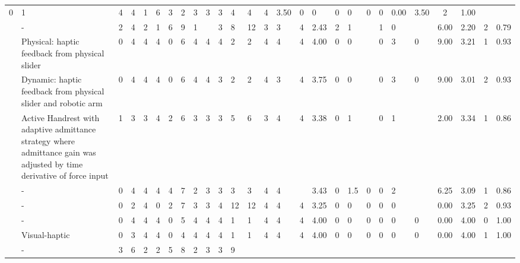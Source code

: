 \begin{table}[htbp]
\begin{tabular}{lp{4cm}lllllllllllllllllllllcccc}
  0 &
  1 &
  4 &
  4 &
  1 &
  6 &
  3 &
  2 &
  3 &
  3 &
  3 &
  4 &
  4 &
  4 &
  3.50 &
  0 &
  0 &
  0\footnotemark[20] &
  0 &
  0 &
  0 &
  0.00 &
  3.50 &
  2 &
  1.00 \\
\cite{Chappell2022} &
  - &
  2 &
  4 &
  2 &
  1 &
  6 &
  9 &
  1 &
   &
  3 &
  8 &
  12 &
  3 &
  3 &
  4 &
  2.43 &
  2 &
  1 &
   &
  1\footnotemark[21] &
  0 &
   &
  6.00 &
  2.20 &
  2 &
  0.79 \\
\cite{Dai2023} &
  Physical: haptic feedback from physical slider &
  0 &
  4 &
  4 &
  4 &
  0 &
  6 &
  4 &
  4 &
  4 &
  2 &
  2 &
  4 &
  4 &
  4\footnotemark[22] &
  4.00 &
  0 &
  0 &
   &
  0 &
  3 &
  0 &
  9.00 &
  3.21 &
  1 &
  0.93 \\
\cite{Dai2023} &
  Dynamic: haptic feedback from physical slider and robotic arm &
  0 &
  4 &
  4 &
  4 &
  0 &
  6 &
  4 &
  4 &
  3 &
  2 &
  2 &
  4 &
  3\footnotemark[23] &
  4\footnotemark[22] &
  3.75 &
  0 &
  0 &
   &
  0 &
  3 &
  0 &
  9.00 &
  3.01 &
  2 &
  0.93 \\
\cite{Fehlberg2012} &
  Active Handrest with adaptive admittance strategy where   admittance gain was adjusted by time derivative of force input &
  1 &
  3 &
  3 &
  4 &
  2 &
  6 &
  3 &
  3 &
  3 &
  5 &
  6 &
  3 &
  4 &
  4 &
  3.38 &
  0 &
  1 &
   &
  0 &
  1 &
   &
  2.00 &
  3.34 &
  1 &
  0.86 \\
\cite{Grant2019} &
  - &
  0 &
  4 &
  4 &
  4 &
  4 &
  7 &
  2 &
  3\footnotemark[24] &
  3 &
  3 &
  3 &
  4 &
  4\footnotemark[25] &
   &
  3.43 &
  0 &
  1.5\footnotemark[26] &
  0 &
  0 &
  2 &
   &
  6.25 &
  3.09 &
  1 &
  0.86 \\
\cite{Gunter2022} &
  - &
  0 &
  2 &
  4 &
  0 &
  2 &
  7 &
  3 &
  3 &
  4 &
  12 &
  12 &
  4 &
  4 &
  4\footnotemark[27] &
  3.25 &
  0 &
  0 &
  0 &
  0 &
  0 &
   &
  0.00 &
  3.25 &
  2 &
  0.93 \\
\cite{Huang2006} &
  - &
  0 &
  4 &
  4 &
  4 &
  0 &
  5 &
  4 &
  4 &
  4 &
  1 &
  1 &
  4 &
  4\footnotemark[28] &
  4\footnotemark[29] &
  4.00 &
  0 &
  0 &
  0 &
  0 &
  0 &
  0 &
  0.00 &
  4.00 &
  0 &
  1.00 \\
\cite{Huang2007} &
  Visual-haptic &
  0 &
  3 &
  4 &
  4 &
  0 &
  4 &
  4 &
  4 &
  4 &
  1 &
  1 &
  4 &
  4\footnotemark[29] &
  4\footnotemark[30] &
  4.00 &
  0 &
  0 &
  0 &
  0 &
  0 &
  0 &
  0.00 &
  4.00 &
  1 &
  1.00 \\
\cite{LeeY2019} &
  - &
  3 &
  6 &
  2 &
  2\footnotemark[31] &
  5 &
  8 &
  2 &
  3\footnotemark[32] &
  3 &
  9 &

\end{tabular}
\end{table}
